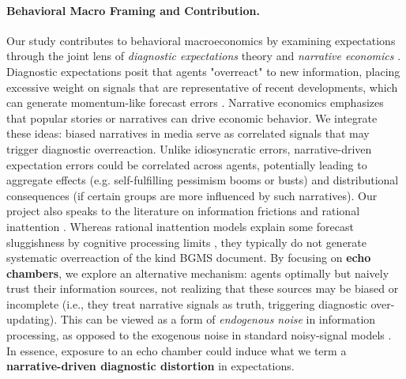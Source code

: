 \documentclass[12pt]{article}
\begin{document}
\paragraph{Behavioral Macro Framing and Contribution.} Our study contributes to behavioral macroeconomics by examining expectations through the joint lens of \emph{diagnostic expectations} theory \citep{BordaloGennaioliMaShleifer2020} and \emph{narrative economics} \citep{Shiller2017}. Diagnostic expectations posit that agents "overreact" to new information, placing excessive weight on signals that are representative of recent developments, which can generate momentum-like forecast errors \citep{GEMMI2026103868}. Narrative economics emphasizes that popular stories or narratives can drive economic behavior. We integrate these ideas: biased narratives in media serve as correlated signals that may trigger diagnostic overreaction. Unlike idiosyncratic errors, narrative-driven expectation errors could be correlated across agents, potentially leading to aggregate effects (e.g. self-fulfilling pessimism booms or busts) and distributional consequences (if certain groups are more influenced by such narratives).
Our project also speaks to the literature on information frictions \citep[e.g.][]{CoibionGorodnichenko2015} and rational inattention \citep{sims2003_implications_rational_inattention}. Whereas rational inattention models explain some forecast sluggishness by cognitive processing limits \citep{sims2003_implications_rational_inattention}, they typically do not generate systematic overreaction of the kind BGMS document. By focusing on \textbf{echo chambers}, we explore an alternative mechanism: agents optimally but naively trust their information sources, not realizing that these sources may be biased or incomplete (i.e., they treat narrative signals as truth, triggering diagnostic over-updating). This can be viewed as a form of \textit{endogenous noise} in information processing, as opposed to the exogenous noise in standard noisy-signal models \citep{sims2003_implications_rational_inattention}. In essence, exposure to an echo chamber could induce what we term a \textbf{narrative-driven diagnostic distortion} in expectations.
\end{document}
